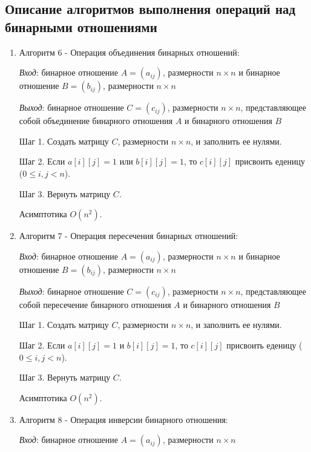 \documentclass[spec, och, labwork]{shiza}
\begin{document}
\subsection{Описание алгоритмов выполнения операций над бинарными отношениями}
            \begin{enumerate}
                \item Алгоритм 6 - Операция объединения бинарных отношений:
                
                \textit{Вход}: бинарное отношение $A = (a_{ij})$, размерности $n \times n$ и бинарное отношение $B = (b_{ij})$, размерности $n \times n$

                \textit{Выход}: бинарное отношение $C = (c_{ij})$, размерности $n \times n$, представляющее собой объединение бинарного отношения $A$ и
                бинарного отношения $B$

                Шаг 1. Создать матрицу $C$, размерности $n \times n$, и заполнить ее нулями.

                Шаг 2. Если $a[i][j]  = 1 \text{ или }b[i][j]  = 1$, то $c[i][j]$ присвоить еденицу ($0 \leq i, j < n$).

                Шаг 3. Вернуть матрицу $C$.

                Асимптотика $O(n^2)$.

                \item Алгоритм 7 - Операция пересечения бинарных отношений:
                
                \textit{Вход}: бинарное отношение $A = (a_{ij})$, размерности $n \times n$ и бинарное отношение $B = (b_{ij})$, размерности $n \times n$

                \textit{Выход}: бинарное отношение $C = (c_{ij})$, размерности $n \times n$, представляющее собой пересечение бинарного отношения $A$ и
                бинарного отношения $B$

                Шаг 1. Создать матрицу $C$, размерности $n \times n$, и заполнить ее нулями.

                Шаг 2. Если $a[i][j]  = 1 \text{ и }b[i][j]  = 1$, то $c[i][j]$ присвоить еденицу ($0 \leq i, j < n$).

                Шаг 3. Вернуть матрицу $C$.

                Асимптотика $O(n^2)$.

                \item Алгоритм 8 - Операция инверсии бинарного отношения:
                
                \textit{Вход}: бинарное отношение $A = (a_{ij})$, размерности $n \times n$


\end{enumerate}
\end{document}
